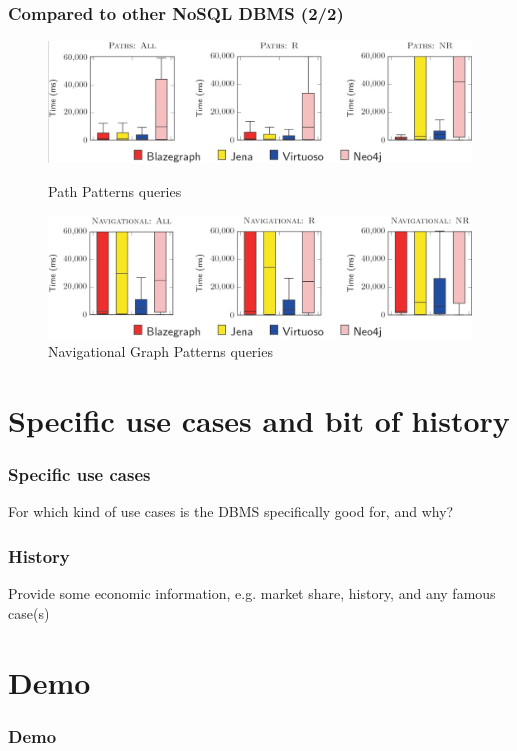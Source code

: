 \documentclass[aspectratio=169]{beamer}
\begin{document}
\begin{frame}
    \frametitle{Compared to other NoSQL DBMS (2/2)}

    \begin{figure}
        \begin{minipage}{0.48\textwidth}
            \centering
            \includegraphics[width=\linewidth]{benchWD3.png}
            \caption{Path Patterns queries}
            \label{fig:path}
        \end{minipage}\hfill
        \begin{minipage}{0.48\textwidth}
            \centering
            \includegraphics[width=\linewidth]{benchWD4.png}
            \caption{Navigational Graph Patterns queries}
            \label{fig:nav}
        \end{minipage}
    \end{figure}
    
\end{frame}


\section{Specific use cases and bit of history}

\begin{frame}
    \frametitle{Specific use cases}
    For which kind of use cases is the DBMS specifically good for, and why?
\end{frame}

\begin{frame}
    \frametitle{History}
    Provide some economic information, e.g. market share, history, and any famous case(s)
\end{frame}

\section{Demo}

\begin{frame}
    \frametitle{Demo}
\end{frame}
\end{document}
